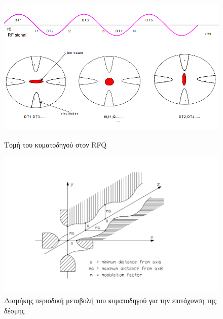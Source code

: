 	
	\begin{figure}[h!]
\centering
\begin{minipage}[c]{0.5\textwidth}
  \centering
  \includegraphics[width=1.1\linewidth]{Accelerating_System/quadtrupole.png}
  \caption{Τομή του κυματοδηγού στον RFQ}
  \label{fig2.2}
\end{minipage}\hfill
\begin{minipage}[r]{0.5\textwidth}\hfill
	\centering
	\includegraphics[width=1.3\linewidth]{Accelerating_System/long_modulation_of_wave_guide_in_RFQ.png}
	\caption{Διαμήκης περιοδική μεταβολή του κυματοδηγού για την επιτάχυνση της δέσμης}
	\label{fig2.3}
\end{minipage}
\end{figure}



